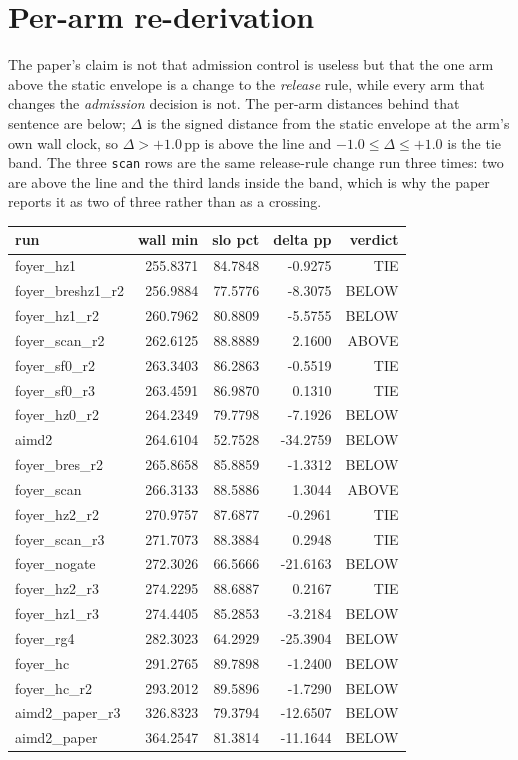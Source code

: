 \documentclass[10pt]{article}
\begin{document}
\section{Per-arm re-derivation}

The paper's claim is not that admission control is useless but that the one arm
above the static envelope is a change to the \emph{release} rule, while every arm
that changes the \emph{admission} decision is not. The per-arm distances behind
that sentence are below; $\Delta$ is the signed distance from the static
envelope at the arm's own wall clock, so $\Delta>+1.0$\,pp is above the line and
$-1.0\le\Delta\le+1.0$ is the tie band. The three \texttt{scan} rows are the
same release-rule change run three times: two are above the line and the third
lands inside the band, which is why the paper reports it as two of three rather
than as a crossing.
\begin{center}\footnotesize\setlength{\tabcolsep}{4pt}
\begin{tabular}{lrrrr}
\toprule
run & wall min & slo pct & delta pp & verdict \\
\midrule
foyer\_hz1 & 255.8371 & 84.7848 & -0.9275 & TIE \\
foyer\_breshz1\_r2 & 256.9884 & 77.5776 & -8.3075 & BELOW \\
foyer\_hz1\_r2 & 260.7962 & 80.8809 & -5.5755 & BELOW \\
foyer\_scan\_r2 & 262.6125 & 88.8889 & 2.1600 & ABOVE \\
foyer\_sf0\_r2 & 263.3403 & 86.2863 & -0.5519 & TIE \\
foyer\_sf0\_r3 & 263.4591 & 86.9870 & 0.1310 & TIE \\
foyer\_hz0\_r2 & 264.2349 & 79.7798 & -7.1926 & BELOW \\
aimd2 & 264.6104 & 52.7528 & -34.2759 & BELOW \\
foyer\_bres\_r2 & 265.8658 & 85.8859 & -1.3312 & BELOW \\
foyer\_scan & 266.3133 & 88.5886 & 1.3044 & ABOVE \\
foyer\_hz2\_r2 & 270.9757 & 87.6877 & -0.2961 & TIE \\
foyer\_scan\_r3 & 271.7073 & 88.3884 & 0.2948 & TIE \\
foyer\_nogate & 272.3026 & 66.5666 & -21.6163 & BELOW \\
foyer\_hz2\_r3 & 274.2295 & 88.6887 & 0.2167 & TIE \\
foyer\_hz1\_r3 & 274.4405 & 85.2853 & -3.2184 & BELOW \\
foyer\_rg4 & 282.3023 & 64.2929 & -25.3904 & BELOW \\
foyer\_hc & 291.2765 & 89.7898 & -1.2400 & BELOW \\
foyer\_hc\_r2 & 293.2012 & 89.5896 & -1.7290 & BELOW \\
aimd2\_paper\_r3 & 326.8323 & 79.3794 & -12.6507 & BELOW \\
aimd2\_paper & 364.2547 & 81.3814 & -11.1644 & BELOW \\
\bottomrule
\end{tabular}\end{center}
\end{document}
